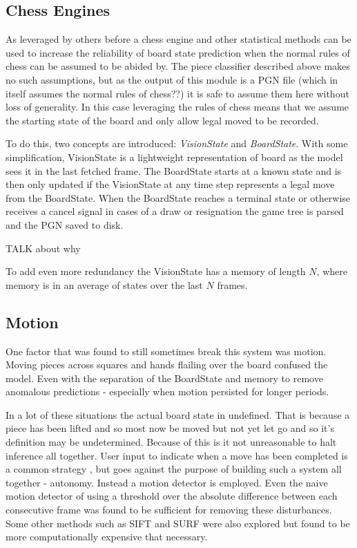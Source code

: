 \subsection{Chess Engines}
As leveraged by others before \cite{} a chess engine and other statistical methods \cite{} can be used to increase the reliability of board state 
prediction when the normal rules of chess can be assumed to be abided by.  The piece classifier described above makes no such assumptions, but as 
the output of this module is a PGN file (which in itself assumes the normal rules of chess??) it is safe to assume them here without loss of 
generality.  In this case leveraging the rules of chess means that we assume the starting state of the board and only allow legal moved to be recorded.

To do this, two concepts are introduced: \textit{VisionState} and \textit{BoardState}.  With some simplification, VisionState is a lightweight 
representation of board as the model sees it in the last fetched frame.  The BoardState starts at a known state and is then only updated if the VisionState at 
any time step represents a legal move from the BoardState. When the BoardState reaches a terminal state or otherwise receives a cancel signal in cases of a 
draw or resignation the game tree is parsed and the PGN saved to disk.

TALK about why

To add even more redundancy the VisionState has a memory of length $N$, where memory is in an average of states over the last $N$ frames.

\subsection{Motion}
One factor that was found to still sometimes break this system was motion.  Moving pieces across squares and hands flailing over the board confused the
model.  Even with the separation of the BoardState and memory to remove anomalous predictions - especially when motion persisted for longer periods.  

In a lot of these situations the actual board state in undefined.  That is because a piece has been lifted and so most now be moved but not yet let go 
and so it's definition may be undetermined.  Because of this is it not unreasonable to halt inference all together.  User input to indicate when a move
has been completed is a common strategy \cite{}, but goes against the purpose of building such a system all together - autonomy.  Instead a motion detector is 
employed.  Even the naive motion detector of using a threshold over the absolute difference between each consecutive frame was found to be sufficient for removing these
disturbances.  Some other methods such as SIFT and SURF were also explored but found to be more computationally expensive that necessary.

